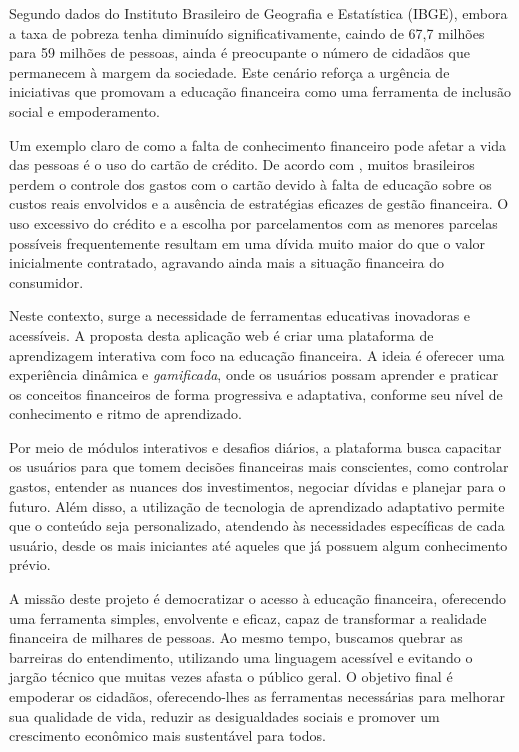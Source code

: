 \documentclass[
	article,			%
	12pt,				%
	oneside,			%
	a4paper,			%
	english,			%
	brazil,				%
	sumario=tradicional
	]{abntex2}
\begin{document}
Segundo dados do Instituto Brasileiro de Geografia e Estatística (IBGE), embora a taxa de pobreza tenha diminuído significativamente, caindo de 67,7 milhões para 59 milhões de pessoas, ainda é preocupante o número de cidadãos que permanecem à margem da sociedade. Este cenário reforça a urgência de iniciativas que promovam a educação financeira como uma ferramenta de inclusão social e empoderamento.

Um exemplo claro de como a falta de conhecimento financeiro pode afetar a vida das pessoas é o uso do cartão de crédito. De acordo com , muitos brasileiros perdem o controle dos gastos com o cartão devido à falta de educação sobre os custos reais envolvidos e a ausência de estratégias eficazes de gestão financeira. O uso excessivo do crédito e a escolha por parcelamentos com as menores parcelas possíveis frequentemente resultam em uma dívida muito maior do que o valor inicialmente contratado, agravando ainda mais a situação financeira do consumidor.

Neste contexto, surge a necessidade de ferramentas educativas inovadoras e acessíveis. A proposta desta aplicação web é criar uma plataforma de aprendizagem interativa com foco na educação financeira. A ideia é oferecer uma experiência dinâmica e \textit{gamificada}, onde os usuários possam aprender e praticar os conceitos financeiros de forma progressiva e adaptativa, conforme seu nível de conhecimento e ritmo de aprendizado. 

Por meio de módulos interativos e desafios diários, a plataforma busca capacitar os usuários para que tomem decisões financeiras mais conscientes, como controlar gastos, entender as nuances dos investimentos, negociar dívidas e planejar para o futuro. Além disso, a utilização de tecnologia de aprendizado adaptativo permite que o conteúdo seja personalizado, atendendo às necessidades específicas de cada usuário, desde os mais iniciantes até aqueles que já possuem algum conhecimento prévio.

A missão deste projeto é democratizar o acesso à educação financeira, oferecendo uma ferramenta simples, envolvente e eficaz, capaz de transformar a realidade financeira de milhares de pessoas. Ao mesmo tempo, buscamos quebrar as barreiras do entendimento, utilizando uma linguagem acessível e evitando o jargão técnico que muitas vezes afasta o público geral. O objetivo final é empoderar os cidadãos, oferecendo-lhes as ferramentas necessárias para melhorar sua qualidade de vida, reduzir as desigualdades sociais e promover um crescimento econômico mais sustentável para todos.
\end{document}
